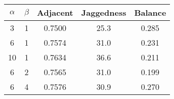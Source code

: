\begin{tabular}{|c|c|c|c|c|}
\hline
$\alpha$ & $\beta$ & Adjacent & Jaggedness & Balance \\
\hline
3 & 1 & 0.7500 & 25.3 & 0.285 \\ 
6 & 1 & 0.7574 & 31.0 & 0.231 \\
10 & 1 & 0.7634 & 36.6 & 0.211 \\
6 & 2 & 0.7565 & 31.0 & 0.199 \\
6 & 4 & 0.7576 & 30.9 & 0.270 \\
\hline
\end{tabular}
